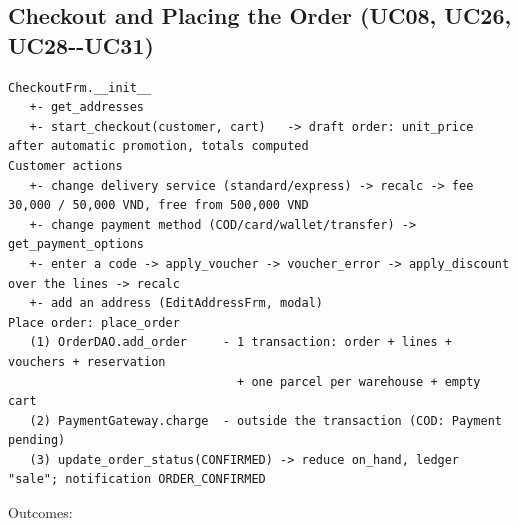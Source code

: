 \hypertarget{checkout-and-placing-the-order-uc08-uc26-uc28--uc31}{%
\subsection{Checkout and Placing the Order (UC08, UC26,
UC28-\/-UC31)}\label{checkout-and-placing-the-order-uc08-uc26-uc28--uc31}}

\begin{lstlisting}[numbers=none]
CheckoutFrm.__init__
   +- get_addresses
   +- start_checkout(customer, cart)   -> draft order: unit_price after automatic promotion, totals computed
Customer actions
   +- change delivery service (standard/express) -> recalc -> fee 30,000 / 50,000 VND, free from 500,000 VND
   +- change payment method (COD/card/wallet/transfer) -> get_payment_options
   +- enter a code -> apply_voucher -> voucher_error -> apply_discount over the lines -> recalc
   +- add an address (EditAddressFrm, modal)
Place order: place_order
   (1) OrderDAO.add_order     - 1 transaction: order + lines + vouchers + reservation
                                + one parcel per warehouse + empty cart
   (2) PaymentGateway.charge  - outside the transaction (COD: Payment pending)
   (3) update_order_status(CONFIRMED) -> reduce on_hand, ledger "sale"; notification ORDER_CONFIRMED
\end{lstlisting}

Outcomes:

